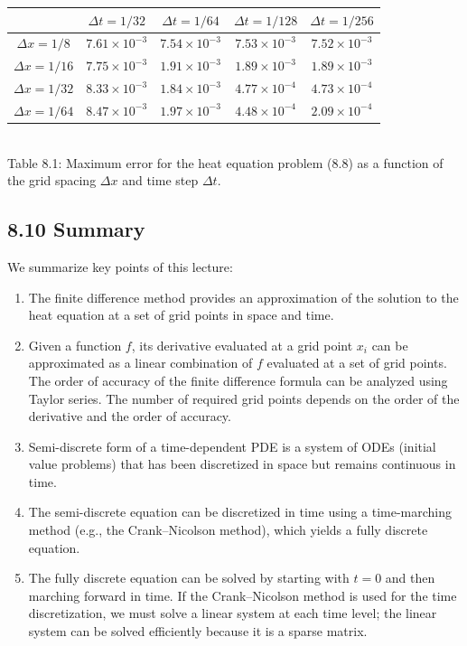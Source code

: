 \begin{center}
    \begin{tabular}{c|cccc}
        & $\Delta t = 1/32$ & $\Delta t = 1/64$ & $\Delta t = 1/128$ & $\Delta t = 1/256$ \\
        \hline
        $\Delta x = 1/8$ & $7.61 \times 10^{-3}$ & $7.54 \times 10^{-3}$ & $7.53 \times 10^{-3}$ & $7.52 \times 10^{-3}$ \\
        $\Delta x = 1/16$ & $7.75 \times 10^{-3}$ & $1.91 \times 10^{-3}$ & $1.89 \times 10^{-3}$ & $1.89 \times 10^{-3}$ \\
        $\Delta x = 1/32$ & $8.33 \times 10^{-3}$ & $1.84 \times 10^{-3}$ & $4.77 \times 10^{-4}$ & $4.73 \times 10^{-4}$ \\
        $\Delta x = 1/64$ & $8.47 \times 10^{-3}$ & $1.97 \times 10^{-3}$ & $4.48 \times 10^{-4}$ & $2.09 \times 10^{-4}$
    \end{tabular}\\[4pt]
    {\small Table 8.1: Maximum error for the heat equation problem (8.8) as a function of the grid spacing $\Delta x$ and time step $\Delta t$.}
\end{center}

\subsection{8.10 Summary}
We summarize key points of this lecture:
\begin{enumerate}
    \item The finite difference method provides an approximation of the solution to the heat equation at a set of grid points in space and time.
    \item Given a function $f$, its derivative evaluated at a grid point $x_i$ can be approximated as a linear combination of $f$ evaluated at a set of grid points. The order of accuracy of the finite difference formula can be analyzed using Taylor series. The number of required grid points depends on the order of the derivative and the order of accuracy.
    \item Semi-discrete form of a time-dependent PDE is a system of ODEs (initial value problems) that has been discretized in space but remains continuous in time.
    \item The semi-discrete equation can be discretized in time using a time-marching method (e.g., the Crank--Nicolson method), which yields a fully discrete equation.
    \item The fully discrete equation can be solved by starting with $t = 0$ and then marching forward in time. If the Crank--Nicolson method is used for the time discretization, we must solve a linear system at each time level; the linear system can be solved efficiently because it is a sparse matrix.
\end{enumerate}
